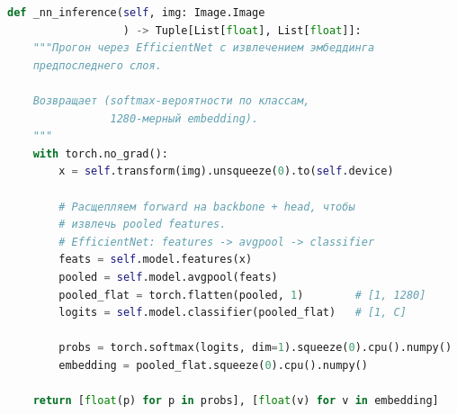 \documentclass[a4paper,12pt]{diplom}
\begin{document}
\begin{lstlisting}[language=Python,basicstyle=\ttfamily\footnotesize,frame=single,caption={Метод \texttt{\_nn\_inference} класса \texttt{StyleClassifier}},label=lst:nn_inference]
def _nn_inference(self, img: Image.Image
                  ) -> Tuple[List[float], List[float]]:
    """Прогон через EfficientNet с извлечением эмбеддинга
    предпоследнего слоя.

    Возвращает (softmax-вероятности по классам,
                1280-мерный embedding).
    """
    with torch.no_grad():
        x = self.transform(img).unsqueeze(0).to(self.device)

        # Расщепляем forward на backbone + head, чтобы
        # извлечь pooled features.
        # EfficientNet: features -> avgpool -> classifier
        feats = self.model.features(x)
        pooled = self.model.avgpool(feats)
        pooled_flat = torch.flatten(pooled, 1)        # [1, 1280]
        logits = self.model.classifier(pooled_flat)   # [1, C]

        probs = torch.softmax(logits, dim=1).squeeze(0).cpu().numpy()
        embedding = pooled_flat.squeeze(0).cpu().numpy()

    return [float(p) for p in probs], [float(v) for v in embedding]
\end{lstlisting}
\end{document}
